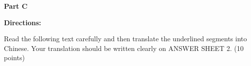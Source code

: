 
\textbf{Part C}

\textbf{Directions:}

Read the following text carefully and then translate the underlined segments into Chinese. Your translation should be written clearly on ANSWER SHEET 2. (10 points)

\vspace{6pt}